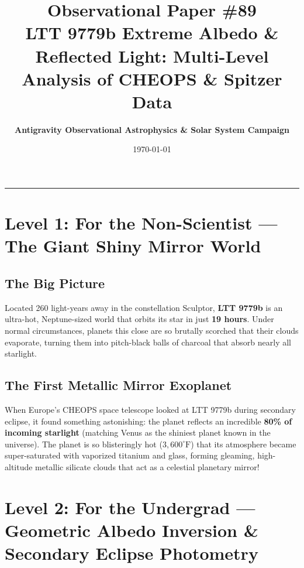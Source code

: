 \documentclass[11pt,a4paper]{article}
\title{\Huge \textbf{Observational Paper \#89}\\ \Large LTT 9779b Extreme Albedo \& Reflected Light: Multi-Level Analysis of CHEOPS \& Spitzer Data}
\author{\textbf{Antigravity Observational Astrophysics \& Solar System Campaign}}
\date{\today}
\begin{document}
\maketitle

\vspace{-1em}
\begin{center}
\rule{\textwidth}{1.5pt}
\end{center}

\section*{Level 1: For the Non-Scientist — The Giant Shiny Mirror World}

\subsection*{The Big Picture}
Located 260 light-years away in the constellation Sculptor, \textbf{LTT 9779b} is an ultra-hot, Neptune-sized world that orbits its star in just \textbf{19 hours}. Under normal circumstances, planets this close are so brutally scorched that their clouds evaporate, turning them into pitch-black balls of charcoal that absorb nearly all starlight.

\subsection*{The First Metallic Mirror Exoplanet}
When Europe's CHEOPS space telescope looked at LTT 9779b during secondary eclipse, it found something astonishing: the planet reflects an incredible \textbf{80\% of incoming starlight} (matching Venus as the shiniest planet known in the universe). The planet is so blisteringly hot ($3{,}600^\circ\text{F}$) that its atmosphere became super-saturated with vaporized titanium and glass, forming gleaming, high-altitude metallic silicate clouds that act as a celestial planetary mirror!

\newpage

\section*{Level 2: For the Undergrad — Geometric Albedo Inversion \& Secondary Eclipse Photometry}
\end{document}
